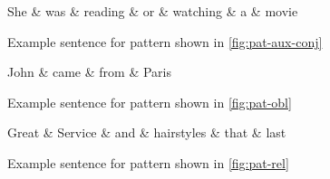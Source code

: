 \documentclass[11pt,a4paper]{article}
\begin{document}
\begin{figure}[h]
    \centering
    \begin{dependency}
    \begin{deptext}[column sep=0.1cm]
    She \& was \& reading \& or \& watching \& a \& movie  \\
    \end{deptext}
    \end{dependency}
    \caption{Example sentence for pattern shown in \cref{fig:pat-aux-conj}}
    \label{fig:reading-or-watching}
\end{figure}

\begin{figure}[h]
    \centering
    \begin{dependency}
    \begin{deptext}[column sep=1em]
    John \& came \& from \& Paris  \\
    \end{deptext}
  \end{dependency}
  \caption{Example sentence for pattern shown in \cref{fig:pat-obl}}
  \label{fig:john-paris}
\end{figure}




\begin{figure}[h]
    \centering
    \begin{dependency}
    \begin{deptext}[column sep=0.1cm]
    Great \& Service \& and \& hairstyles \& that \& last  \\
    \end{deptext}
    \end{dependency}
    \caption{Example sentence for pattern shown in \cref{fig:pat-rel}}
    \label{fig:aclrecl}
\end{figure}
    
\end{document}
